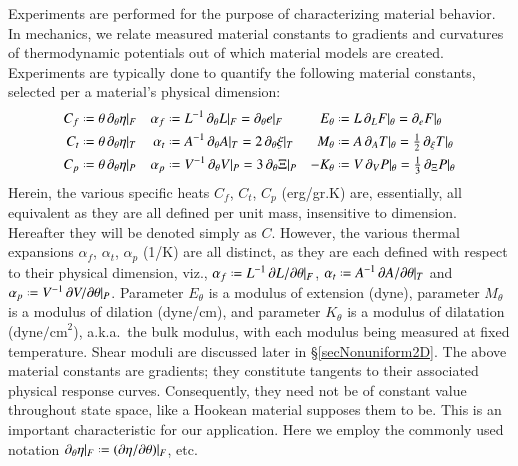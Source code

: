 Experiments are performed for the purpose of characterizing material behavior.  In mechanics, we relate measured material constants to gradients and curvatures of thermo\-dynamic potentials out of which material models are created.  Experiments are typically done to quantify the following material constants, selected per a material's physical dimension:
\begin{subequations}
\label{materialConstants}
\begin{align}
C_f & \defeq \theta \, \partial_{\theta} \eta |_F & 
\alpha_f & \defeq L^{-1} \, \partial_{\theta} L |_F = 
\partial_{\theta} e |_F &
E_{\theta} & \defeq L \, \partial_L F |_{\theta} = 
\partial_e F |_{\theta} \\
C_t & \defeq \theta \, \partial_{\theta} \eta |_T & 
\alpha_t & \defeq A^{-1} \, \partial_{\theta} A |_T = 
2 \, \partial_{\theta} \xi |_T &
M_{\theta} & \defeq A \, \partial_A T |_{\theta} = 
\tfrac{1}{2} \, \partial_{\xi} T |_{\theta} \\
C_p & \defeq \theta \, \partial_{\theta} \eta |_P & 
\alpha_p & \defeq V^{-1} \, \partial_{\theta} V |_P = 
3 \, \partial_{\theta} \Xi |_P &
-K_{\theta} & \defeq V \, \partial_V P |_{\theta} = 
\tfrac{1}{3} \, \partial_{\Xi} P |_{\theta}
\end{align}
\end{subequations}
Herein, the various specific heats $C_f$, $C_t$, $C_p$ (erg/gr.K) are, essentially,  all equivalent as they are all defined per unit mass, insensitive to dimension.  Hereafter they will be denoted simply as $C$.  However, the various thermal expansions $\alpha_f$, $\alpha_t$, $\alpha_p$ (1/K) are all distinct, as they are each defined with respect to their physical dimension, viz., $\alpha_f \defeq L^{-1} \, \partial L / \partial \theta |_F$, $\alpha_t \defeq A^{-1} \, \partial A / \partial \theta |_T$ and $\alpha_p \defeq V^{-1} \, \partial V / \partial \theta |_P$.  Parameter $E_{\theta}$ is a modulus of extension (dyne), parameter $M_{\theta}$ is a modulus of dilation (dyne/cm), and parameter $K_{\theta}$ is a modulus of dilatation ($\mathrm{dyne/cm}^2$), a.k.a.\ the bulk modulus, with each modulus being measured at fixed temperature.  Shear moduli are discussed later in \S\ref{secNonuniform2D}.  The above material constants are gradients; they constitute tangents to their associated physical response curves.  Consequently, they need not be of constant value throughout state space, like a Hookean material supposes them to be.  This is an important characteristic for our application.  Here we employ the commonly used notation $\partial_{\theta} \eta |_F \defeq ( \partial \eta / \partial \theta ) |_F$, etc.

